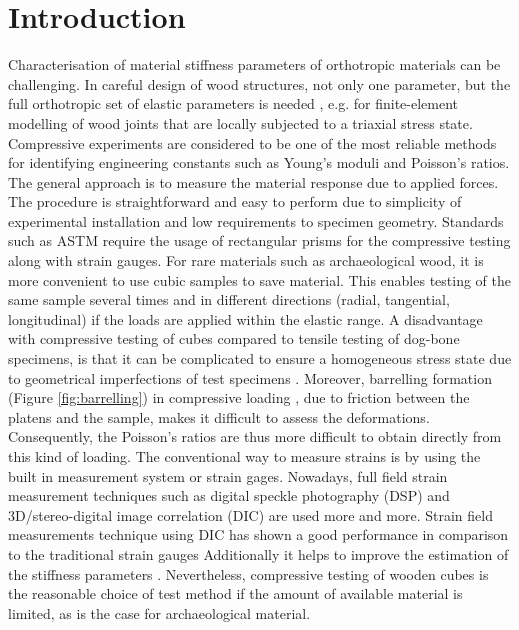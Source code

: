 \documentclass[review]{elsarticle}
\begin{document}
\linenumbers

\section{Introduction}

Characterisation of material stiffness parameters of orthotropic materials can
be challenging. In  careful design of wood structures, not only one parameter, but the full
orthotropic set of elastic parameters is needed \cite{tsoumis1991science},
e.g. for finite-element modelling of wood joints that are locally subjected to a
triaxial stress state. Compressive experiments are considered to be one of the most reliable methods for identifying engineering constants such as Young's moduli and Poisson's
ratios. The general approach is to measure the material response due to applied
forces. The procedure is straightforward and easy to perform due to simplicity of experimental installation and low requirements to specimen
geometry. Standards such as ASTM \cite{standard1997d143,
johnson1983compression} require the usage of rectangular prisms for
the compressive testing along with strain gauges.
For rare materials such as archaeological wood, it is more convenient to use
cubic samples \cite{ljungdahl2007transverse} to save material. 
This enables testing of the same sample several times and in
different directions (radial, tangential, longitudinal) if the loads are
applied within the elastic range.
A disadvantage with compressive testing of cubes compared to tensile testing of
dog-bone specimens, is that it can be complicated to ensure a homogeneous stress state
due to geometrical imperfections of test specimens \cite{Toftegaard1999849}.
Moreover, barrelling formation (Figure \ref{fig:barrelling}) in compressive
loading \cite{oldroyd1966stress}, due to friction between the platens and the
sample, makes it difficult to assess the  deformations.
Consequently, the Poisson's ratios are thus more difficult to obtain directly from this kind
of loading.
The conventional way to measure strains is by using the built in measurement
system or strain gages. Nowadays, full field strain measurement techniques such
as digital speckle photography (DSP) \cite{synnergren1999stereoscopic} and
3D/stereo-digital image correlation (DIC) \cite{majano2012test} are used more
and more. Strain field measurements technique using DIC has shown a good
performance in comparison to the traditional strain gauges
\cite{huang2010optical,xavier2012stereovision} Additionally it helps to
improve the estimation of the stiffness parameters \cite{dahl2009planar,
majano2012test, ozyhar2013moisture}. 
Nevertheless, compressive testing of wooden cubes is the reasonable 
choice of test method if the amount of available material is limited, as is the case for archaeological material.\par 
\end{document}
